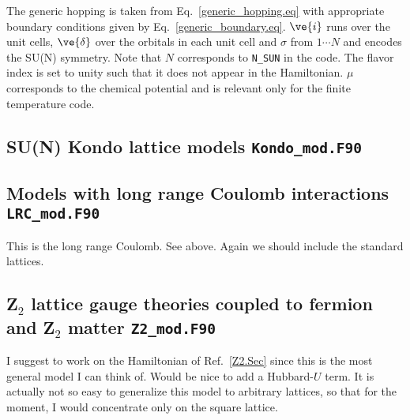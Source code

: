 The  generic hopping is taken from Eq.~\ref{generic_hopping.eq}   with appropriate boundary conditions given by Eq.~\ref{generic_boundary.eq}.    $\ve{i}$ runs over the unit cells, $\ve{\delta}$ over the orbitals in each unit cell and $\sigma$  from $1 \cdots N$  and encodes  the SU(N) symmetry.    Note that  $N$ corresponds to \texttt{N\_SUN}  in the code.  The flavor index is set to  unity such that it does not appear in the  Hamiltonian.  $\mu$ corresponds to the chemical potential  and is relevant only for the finite temperature code. 

\subsection{  SU(N) Kondo lattice models  \texttt{Kondo\_mod.F90}}


\subsection{  Models with long range Coulomb interactions  \texttt{LRC\_mod.F90}}

This is the long range Coulomb. See above.    Again we should include the   standard lattices. 

\subsection{Z$_2$ lattice gauge theories coupled to fermion and  Z$_2$ matter    \texttt{Z2\_mod.F90}}
I suggest to work on the  Hamiltonian of Ref.~\ref{Z2.Sec} since this is the most general  model I can think of.   Would be nice to add a Hubbard-$U$ term.  It is actually not so easy to generalize this model to 
arbitrary lattices, so that for the moment, I would concentrate only on the square lattice. 
